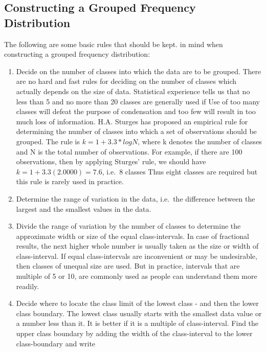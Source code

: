 \documentclass[]{article}
\begin{document}
\hypertarget{constructing-a-grouped-frequency-distribution}{%
\subsection{Constructing a Grouped Frequency
Distribution}\label{constructing-a-grouped-frequency-distribution}}

The following are some basic rules that should be kept. in mind when
constructing a grouped frequency distribution:

\begin{enumerate}
\def\labelenumi{(\roman{enumi})}
\item
  Decide on the number of classes into which the data are to be grouped.
  There are no hard and fast rules for deciding on the number of classes
  which actually depends on the size of data. Statistical experience
  tells us that no less than 5 and no more than 20 classes are generally
  used if Use of too many classes will defeat the purpose of
  condensation and too few will result in too much loss of information.
  H.A. Sturges has proposed an empirical rule for determining the number
  of classes into which a set of observations should be grouped. The
  rule is \(k = 1 + 3.3 * logN\), where k denotes the number of classes
  and N is the total number of observations. For example, if there are
  100 observations, then by applying Sturges' rule, we should have
  \(k=1+3.3 (2.0000) = 7.6\), i.e.~8 classes Thus eight classes are
  required but this rule is rarely used in practice.
\item
  Determine the range of variation in the data, i.e.~the difference
  between the largest and the smallest values in the data.
\item
  Divide the range of variation by the number of classes to determine
  the approximate width or size of the equal class-intervals. In case of
  fractional results, the next higher whole number is usually taken as
  the size or width of class-interval. If equal class-intervals are
  inconvenient or may be undesirable, then classes of unequal size are
  used. But in practice, intervals that are multiple of 5 or 10, are
  commonly used as people can understand them more readily.
\item
  Decide where to locate the class limit of the lowest class - and then
  the lower class boundary. The lowest class usually starts with the
  smallest data value or a number less than it. It is better if it is a
  multiple of class-interval. Find the upper class boundary by adding
  the width of the class-interval to the lower class-boundary and write

\end{enumerate}
\end{document}
